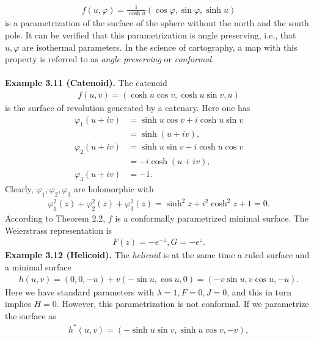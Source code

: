 \documentclass[a4paper]{article}
\numberwithin{equation}{section}
\begin{document}
\begin{align}
f\left( {u,\varphi } \right) = \frac{1}{{\cosh u}}\left( {\cos \varphi ,\sin \varphi ,\sinh u} \right)
\end{align}
is a parametrization of the surface of the sphere without the north and the south pole. It can be verified that this parametrization is angle preserving, i.e., that $u,\varphi$ are isothermal parameters. In the science of cartography, a map with this property is referred to as \textit{angle preserving} or \textit{conformal}.\\
\\
\textbf{Example 3.11 (Catenoid).} The catenoid
\begin{align}
f\left( {u,v} \right) = \left( {\cosh u\cos v,\cosh u\sin v,u} \right)
\end{align} 
is the surface of revolution generated by a catenary. Here one has
\begin{align}
{\varphi _1}\left( {u + iv} \right) &= \sinh u\cos v + i\cosh u\sin v\\
 &= \sinh \left( {u + iv} \right),\\
{\varphi _2}\left( {u + iv} \right) &= \sinh u\sin v - i\cosh u\cos v\\
 &=  - i\cosh \left( {u + iv} \right),\\
{\varphi _3}\left( {u + iv} \right) &=  - 1.
\end{align}
Clearly, $\varphi_1,\varphi_2,\varphi_3$ are holomorphic with
\begin{align}
\varphi _1^2\left( z \right) + \varphi _2^2\left( z \right) + \varphi _3^2\left( z \right) = {\sinh ^2}z + {i^2}{\cosh ^2}z + 1 = 0.
\end{align}
According to Theorem 2.2, $f$ is a conformally parametrized minimal surface. The Weierstrass representation is
\begin{align}
F\left( z \right) =  - {e^{ - z}},G =  - {e^z}.
\end{align}
\textbf{Example 3.12 (Helicoid).} The \textit{helicoid} is at the same time a ruled surface and a minimal surface
\begin{align}
h\left( {u,v} \right) = \left( {0,0, - u} \right) + v\left( { - \sin u,\cos u,0} \right) = \left( { - v\sin u,v\cos u, - u} \right).
\end{align}
Here we have standard parameters with $\lambda =1,F=0,J=0$, and this in turn implies $H=0$. However, this parametrization is not conformal. If we parametrize the surface as
\begin{align}
{h^*}\left( {u,v} \right) = \left( { - \sinh u\sin v,\sinh u\cos v, - v} \right),
\end{align}
\end{document}
